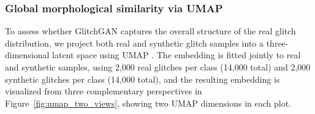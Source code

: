 \documentclass[reprint,nofootinbib,amsmath,amssymb,aps,floatfix]{revtex4-2}
\begin{document}
\begin{table}[h]
\centering
\caption{Gravity Spy classification results for GlitchGAN-generated glitches ($n=100$ samples per class, 700 total). Accuracy intervals use the Wilson score method; confidence intervals use a percentile bootstrap (10{,}000 resamples).}
\label{tab:gspy_ci}
\end{table}


\subsubsection{Global morphological similarity via UMAP}
\label{sec:glitchgan_umap}
To assess whether GlitchGAN captures the overall structure of the real glitch distribution, we project both real and synthetic glitch samples into a three-dimensional latent space using UMAP \citep{McInnes_2018}.
The embedding is fitted jointly to real and synthetic samples, using 2,000 real glitches per class (14,000 total) and 2,000 synthetic glitches per class (14,000 total), and the resulting embedding is visualized from three complementary perspectives in Figure~\ref{fig:umap_two_views}, showing two UMAP dimensions in each plot.
\end{document}
